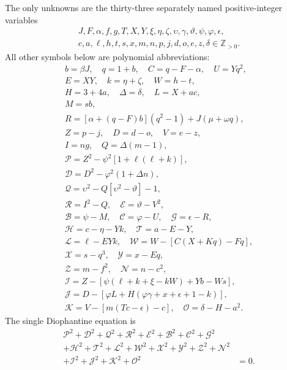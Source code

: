 The only unknowns are the thirty-three separately named positive-integer variables
\[
\begin{gathered}J,F,\alpha,f,g,T,X,Y,\xi,\eta,\zeta,\upsilon,\gamma,\vartheta,\psi,\varphi,\epsilon,\\
c,a,\ell,h,t,s,x,m,n,p,j,d,o,e,z,\delta\in\mathbb Z_{>0}.\end{gathered}
\]
All other symbols below are polynomial abbreviations:
\[
\begin{gathered}
b=\beta J,\quad q=1+b,\quad C=q-F-\alpha,\quad U=Yq^2,\\
E=XY,\quad k=\eta+\zeta,\quad W=h-t,\\
H=3+4a,\quad\Delta=\delta,\quad L=X+ac,\\
M=sb,\\
R=[\alpha+(q-F)b](q^2-1)+J(\mu+\omega q),\\
Z=p-j,\quad D=d-o,\quad V=e-z,\\
I=ng,\quad Q=\Delta(m-1),\\
\mathcal{P}=Z^2-\psi^2[1+\ell(\ell+k)],\\
\mathcal{D}=D^2-\varphi^2(1+\Delta n),\\
\mathcal{Q}=\upsilon^2-Q[\upsilon^2-\vartheta]-1,\\
\mathcal{R}=I^2-Q,\quad \mathcal{E}=\vartheta-V^2,\\
\mathcal{B}=\psi-M,\quad \mathcal{C}=\varphi-U,\quad \mathcal{G}=\epsilon-R,\\
\mathcal{H}=c-\eta-Yk,\quad \mathcal{T}=a-E-Y,\\
\mathcal{L}=\ell-EYk,\quad \mathcal{W}=W-[C(X+Kq)-Fq],\\
\mathcal{X}=s-q^3,\quad \mathcal{Y}=x-Eq,\\
\mathcal{Z}=m-f^2,\quad \mathcal{N}=n-c^2,\\
\mathcal{I}=Z-[\psi(\ell+k+\xi-kW)+Yb-Ws],\\
\mathcal{J}=D-[\varphi L+H(\varphi\gamma+x+\epsilon+1-k)],\\
\mathcal{K}=V-[m(Tc-\epsilon)-c],\quad\mathcal{O}=\delta-H-a^2.
\end{gathered}
\]
The single Diophantine equation is
\[
\begin{split}
\mathcal{P}^2+\mathcal{D}^2+\mathcal{Q}^2+\mathcal{R}^2+\mathcal{E}^2+\mathcal{B}^2+\mathcal{C}^2+\mathcal{G}^2 &\\
+\mathcal{H}^2+\mathcal{T}^2+\mathcal{L}^2+\mathcal{W}^2+\mathcal{X}^2+\mathcal{Y}^2+\mathcal{Z}^2+\mathcal{N}^2 &\\
+\mathcal{I}^2+\mathcal{J}^2+\mathcal{K}^2+\mathcal{O}^2 &= 0.
\end{split}
\]
